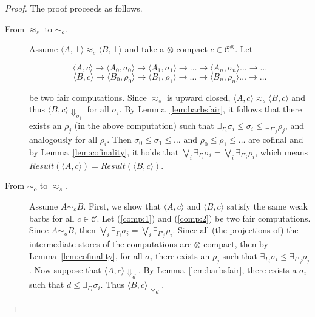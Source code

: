 \documentclass[main.tex]{subfiles}
\begin{document}
\begin{proof}%
	The proof proceeds as follows.
	\begin{description}
		\item[From $\approx_{\mathit{s}}$ to $\sim_o$.] Assume  $\langle A, \bot \rangle \approx_{\mathit{s}} \langle B, \bot \rangle$ and take a $\otimes$-compact $c \in \mathcal{C}^\otimes$. Let
		
		\begin{equation}\label{comp:1}\langle A, c \rangle \longrightarrow \langle A_0, \sigma_0 \rangle \longrightarrow \langle A_1, \sigma_1 \rangle \longrightarrow \dots \longrightarrow \langle A_n, \sigma_n \rangle \dots \longrightarrow \dots
		\end{equation}
		\begin{equation}\label{comp:2}\langle B, c \rangle \longrightarrow \langle B_0, \rho_0 \rangle \longrightarrow \langle B_1, \rho_1 \rangle \longrightarrow \dots \longrightarrow \langle B_n, \rho_n \rangle \dots \longrightarrow \dots
		\end{equation}
		
		be two fair computations. Since $\approx_{\mathit{s}}$ is upward closed, 
		$\langle A, c \rangle \approx_{\mathit{s}} \langle B, c \rangle$ and thus $\langle B, c\rangle \Downarrow_{\sigma_i}$ for all $\sigma_i$. By Lemma~\ref{lem:barbsfair}, it follows that there exists an $\rho_j$ (in the above computation) such that 
		$\exists_{\Gamma_i} \sigma_i \leq \sigma_i \leq \exists_{\Gamma'_j} \rho_j$, and analogously for all $\rho_i$.
		Then $\sigma_0 \leq \sigma_1 \leq \dots$  and $\rho_0 \leq \rho_1 \leq \dots$ are cofinal and by Lemma~\ref{lem:cofinality}, it holds that $\bigvee_i \exists_{\Gamma_i} \sigma_i = \bigvee_i \exists_{\Gamma'_i} \rho_i$, which means 
		$\mathit{Result}(\langle A, c \rangle) = \mathit{Result}(\langle B, c \rangle)$.
		
		\item[From $\sim_o$ to $\approx_{\mathit{s}}$.] Assume $A \sim_o B$. First, we show that $\langle A, c\rangle$ and $\langle B, c\rangle$ satisfy the same weak barbs  for all $c \in \mathcal{C}$. Let (\ref{comp:1}) and (\ref{comp:2}) be two fair computations. Since $A \sim_o B$, then $\bigvee_i \exists_{\Gamma_i} \sigma_i = \bigvee_i \exists_{\Gamma'_j} \rho_i$. Since all (the projections of) the intermediate stores of the computations are $\otimes$-compact,
		then by Lemma~\ref{lem:cofinality}, for all $\sigma_i$ there exists an $\rho_j$ such that $\exists_{\Gamma_i} \sigma_i \leq \exists_{\Gamma'_j} \rho_j$. 
		Now suppose that $\langle A, c \rangle \Downarrow_d$. By Lemma~\ref{lem:barbsfair}, there exists a $\sigma_i$ 
		such that $d \leq \exists_{\Gamma_i} \sigma_i$. Thus 
		$\langle B, c\rangle \Downarrow_d$.
		

\end{description}
\end{proof}
\end{document}
